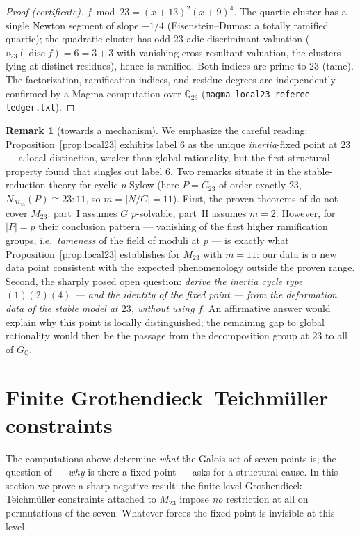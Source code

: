 \documentclass[11pt]{amsart}
\newcommand{\QQ}{\mathbb{Q}}
\newcommand{\GQ}{G_{\QQ}}
\newcommand{\Mtw}{M_{23}}
\theoremstyle{plain}
\theoremstyle{definition}
\newtheorem{remark}[theorem]{Remark}
\begin{document}
\begin{proof}[Proof (certificate)]
$f\bmod 23=(x+13)^2(x+9)^4$. The quartic cluster has a single Newton
segment of slope $-1/4$ (Eisenstein--Dumas: a totally ramified
quartic); the quadratic cluster has odd $23$-adic discriminant
valuation ($v_{23}(\operatorname{disc}f)=6=3+3$ with vanishing
cross-resultant valuation, the clusters lying at distinct residues),
hence is ramified. Both indices are prime to $23$ (tame). The
factorization, ramification indices, and residue degrees are
independently confirmed by a Magma computation over
$\QQ_{23}$ (\texttt{magma-local23-referee-ledger.txt}).
\end{proof}

\begin{remark}[towards a mechanism]
We emphasize the careful reading: Proposition~\ref{prop:local23}
exhibits label $6$ as the unique \emph{inertia}-fixed point at
$23$ --- a local distinction, weaker than global rationality, but
the first structural property found that singles out label $6$. Two remarks situate it in the stable-reduction
theory for cyclic $p$-Sylow (here $P=C_{23}$ of order exactly $23$,
$N_{\Mtw}(P)\cong 23{:}11$, so $m=|N/C|=11$). First, the proven
theorems of \cite{ObusI,ObusII} do not cover $\Mtw$: part~I assumes
$G$ $p$-solvable, part~II assumes $m=2$. However, for $|P|=p$ their
conclusion pattern --- vanishing of the first higher ramification
groups, i.e.\ \emph{tameness} of the field of moduli at $p$ --- is
exactly what Proposition~\ref{prop:local23} establishes for
$\Mtw$ with $m=11$: our data is a new data point consistent with
the expected phenomenology outside the proven range. Second, the
sharply posed open question: \emph{derive the inertia cycle type
$(1)(2)(4)$ --- and the identity of the fixed point --- from the
deformation data of the stable model at $23$, without using $f$}.
An affirmative answer would explain why this point is locally
distinguished; the remaining gap to global rationality would then be
the passage from the decomposition group at $23$ to all of $\GQ$.
\end{remark}

\PtwoHundredLine

\section{Finite Grothendieck--Teichm\"uller constraints}\label{sec:gt}

The computations above determine \emph{what} the Galois set of seven
points is; the question of \cite{HJLPPZ} --- \emph{why} is there a
fixed point --- asks for a structural cause. In this section we prove
a sharp negative result: the finite-level Grothendieck--Teichm\"uller
constraints attached to $\Mtw$ impose \emph{no} restriction at all on
permutations of the seven. Whatever forces the fixed point is
invisible at this level.
\end{document}
